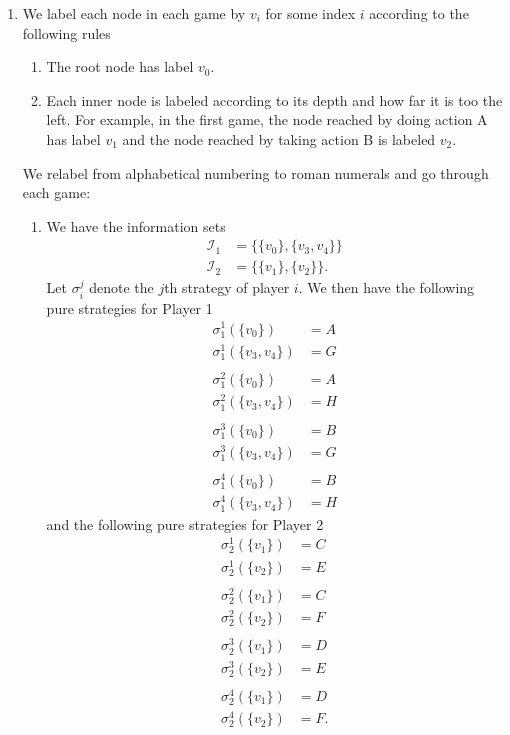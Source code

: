 \documentclass[a4paper]{article}
\begin{document}
\begin{exercise}{3}
\begin{enumerate}[label=(\alph*)]
    \item We label each node in each game by $ v_i $ for some index $ i $ according to the following rules
      \begin{enumerate}[label=(\arabic*)]
        \item The root node has label $ v_0 $.
        \item Each inner node is labeled according to its depth and how far it is too the left. For example, in the first game, the node reached by doing action A has label $ v_1 $ and the node reached by taking action B is labeled $ v_2 $.
      \end{enumerate}
      We relabel from alphabetical numbering to roman numerals and go through each game:
      \begin{enumerate}[label=(\roman*)]
        \item We have the information sets
          \begin{align*}
            \mathcal{I}_1 &= \{\{v_0\}, \{v_3, v_4\}\} \\
            \mathcal{I}_2 &= \{\{v_1\}, \{v_2\}\}
          .\end{align*}
          Let $ \sigma_i^{j} $ denote the $ j $th strategy of player $ i $. We then have the following pure strategies for Player 1
          \begin{align*}
            \sigma_1^{1}(\{v_0\}) &= A \\
            \sigma_1^{1}(\{v_3, v_4\}) &= G \\
            \\
            \sigma_1^{2}(\{v_0\}) &= A \\
            \sigma_1^2(\{v_3, v_4\}) &= H \\
            \\
            \sigma_1^{3}(\{v_0\}) &= B \\
            \sigma_1^3(\{v_3, v_4\}) &= G \\
            \\
            \sigma_1^{4}(\{v_0\}) &= B \\
            \sigma_1^4(\{v_3, v_4\}) &= H
          \end{align*}
          and the following pure strategies for Player 2
          \begin{align*}
            \sigma_2^{1}(\{v_1\}) &= C \\
            \sigma_2^{1}(\{v_2\}) &= E \\
            \\
            \sigma_2^{2}(\{v_1\}) &= C \\
            \sigma_2^{2}(\{v_2\}) &= F \\
            \\
            \sigma_2^{3}(\{v_1\}) &= D \\
            \sigma_2^{3}(\{v_2\}) &= E \\
            \\
            \sigma_2^{4}(\{v_1\}) &= D \\
            \sigma_2^{4}(\{v_2\}) &= F
          .\end{align*}


\end{enumerate}
\end{enumerate}
\end{exercise}
\end{document}
